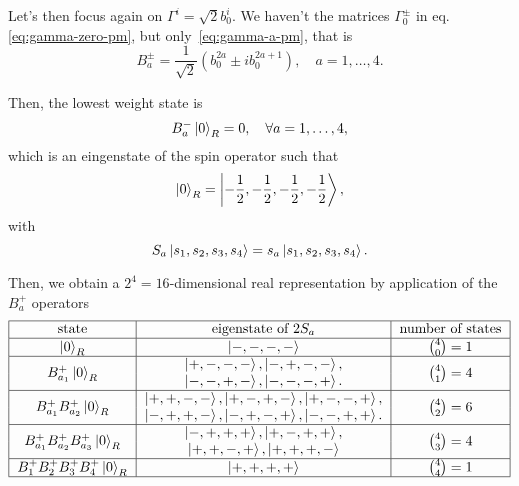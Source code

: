 Let's then focus again on $\Gamma^i = \sqrt{2}b^i_0$. We haven't the matrices $\Gamma^\pm_0$ in eq.\eqref{eq:gamma-zero-pm}, but only~\eqref{eq:gamma-a-pm}, that is
\begin{equation}
    B^\pm_a = \frac{1}{\sqrt{2}} \left( b^{2a}_0 \pm i b^{2a+1}_0 \right), \quad a = 1, \dots, 4.
\end{equation}

Then, the lowest weight state is
\begin{equation}
    B^-_a\ket{0}_{R} = 0, \quad \forall a = 1, \dots, 4,
\end{equation}
which is an eingenstate of the spin operator such that
\begin{equation}
    \ket{0}_{R} = \ket{-\frac{1}{2},-\frac{1}{2},-\frac{1}{2},-\frac{1}{2}},
\end{equation}
with
\begin{equation}
    S_a \ket{s_1,s_2,s_3,s_4} = s_a \ket{s_1,s_2,s_3,s_4}.
\end{equation}

Then, we obtain a $2^4 = 16$-dimensional real representation by application of the $B^+_a$ operators
\begin{equation*}
    \begin{tabular}{|c|c|c|} \hline
        state & eigenstate of $2S_a$ & number of states \\ \hline
        $\ket{0}_{R}$ & $\ket{-,-,-,-}$ & $\binom{4}{0} = 1$ \\ \hline
        \multirow{2}{*}{$B^+_{a_1} \ket{0}_{R}$} & $\ket{+,-,-,-}, \ket{-,+,-,-},$ & \multirow{2}{*}{$\binom{4}{1} = 4$} \\ 
        & $\ket{-,-,+,-}, \ket{-,-,-,+}.$ & \\ \hline
        \multirow{2}{*}{$B^+_{a_1}B^+_{a_2}\ket{0}_{R}$} & $\ket{+,+,-,-}, \ket{+,-,+,-}, \ket{+,-,-,+},$ & \multirow{2}{*}{$\binom{4}{2} = 6$} \\ 
        & $\ket{-,+,+,-}, \ket{-,+,-,+}, \ket{-,-,+,+}.$ & \\ \hline
        \multirow{2}{*}{$B^+_{a_1}B^+_{a_2}B^+_{a_3} \ket{0}_{R}$} & $\ket{-,+,+,+}, \ket{+,-,+,+},$ & \multirow{2}{*}{$\binom{4}{3} = 4$} \\ 
        & $\ket{+,+,-,+}, \ket{+,+,+,-}$ & \\ \hline
        $B^+_{1}B^+_{2}B^+_{3}B^+_{4} \ket{0}_{R}$ & $\ket{+,+,+,+}$ & $\binom{4}{4} = 1$ \\ \hline
    \end{tabular}
\end{equation*}

